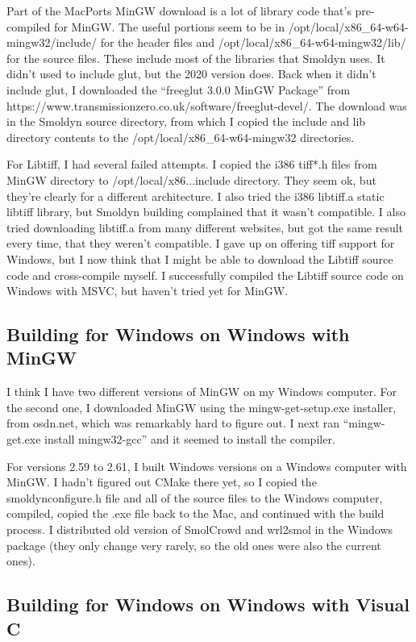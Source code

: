 \documentclass {scrbook}
\begin{document}
Part of the MacPorts MinGW download is a lot of library code that's pre-compiled for MinGW. The useful portions seem to be in /opt/local/x86\_64-w64-mingw32/include/ for the header files and /opt/local/x86\_64-w64-mingw32/lib/ for the source files. These include most of the libraries that Smoldyn uses. It didn't used to include glut, but the 2020 version does. Back when it didn't include glut, I downloaded the ``freeglut 3.0.0 MinGW Package'' from https://www.transmissionzero.co.uk/software/freeglut-devel/. The download was in the Smoldyn source directory, from which I copied the include and lib directory contents to the /opt/local/x86\_64-w64-mingw32 directories.

For Libtiff, I had several failed attempts. I copied the i386 tiff*.h files from MinGW directory to /opt/local/x86...include directory. They seem ok, but they're clearly for a different architecture. I also tried the i386 libtiff.a static libtiff library, but Smoldyn building complained that it wasn't compatible. I also tried downloading libtiff.a from many different websites, but got the same result every time, that they weren't compatible. I gave up on offering tiff support for Windows, but I now think that I might be able to download the Libtiff source code and cross-compile myself. I successfully compiled the Libtiff source code on Windows with MSVC, but haven't tried yet for MinGW.


\subsection{Building for Windows on Windows with MinGW}

I think I have two different versions of MinGW on my Windows computer. For the second one, I downloaded MinGW using the mingw-get-setup.exe installer, from osdn.net, which was remarkably hard to figure out. I next ran ``mingw-get.exe install mingw32-gcc'' and it seemed to install the compiler.

For versions 2.59 to 2.61, I built Windows versions on a Windows computer with MinGW. I hadn't figured out CMake there yet, so I copied the smoldynconfigure.h file and all of the source files to the Windows computer, compiled, copied the .exe file back to the Mac, and continued with the build process. I distributed old version of SmolCrowd and wrl2smol in the Windows package (they only change very rarely, so the old ones were also the current ones).

\subsection{Building for Windows on Windows with Visual C}
\end{document}
